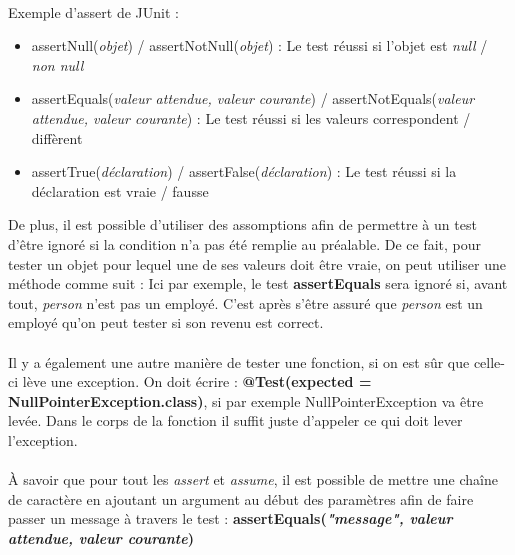 \paragraph{}
Exemple d'assert de JUnit :
\begin{itemize}
    \item assertNull(\textit{objet}) / assertNotNull(\textit{objet}) : Le test réussi si l'objet est \textit{null} / \textit{non null}
    \item assertEquals(\textit{valeur attendue, valeur courante}) / assertNotEquals(\textit{valeur attendue, valeur courante}) : Le test réussi si les valeurs correspondent / diffèrent
    \item assertTrue(\textit{déclaration}) / assertFalse(\textit{déclaration}) : Le test réussi si la déclaration est vraie / fausse
\end{itemize}
De plus, il est possible d'utiliser des assomptions afin de permettre à un test d'être ignoré si la condition n'a pas été remplie au préalable. De ce fait, pour tester un objet pour lequel une de ses valeurs doit être vraie, on peut utiliser une méthode comme suit :\label{assume}
Ici par exemple, le test \textbf{assertEquals} sera ignoré si, avant tout, \textit{person} n'est pas un employé. C'est après s'être assuré que \textit{person} est un employé qu'on peut tester si son revenu est correct.

\paragraph{}
Il y a également une autre manière de tester une fonction, si on est sûr que celle-ci lève une exception. On doit écrire : \textbf{@Test(expected = NullPointerException.class)}, si par exemple NullPointerException va être levée. Dans le corps de la fonction il suffit juste d'appeler ce qui doit lever l'exception.

\paragraph{}
À savoir que pour tout les \textit{assert} et \textit{assume}, il est possible de mettre une chaîne de caractère en ajoutant un argument au début des paramètres afin de faire passer un message à travers le test : \textbf{assertEquals(\textit{"message", valeur attendue, valeur courante})}

